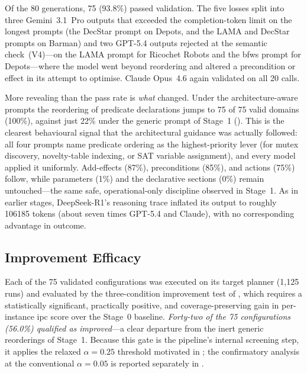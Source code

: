 Of the 80 generations, 75 (93.8\%) passed validation. The five losses split into three Gemini~3.1~Pro outputs that exceeded the completion-token limit on the longest prompts (the DecStar prompt on Depots, and the LAMA and DecStar prompts on Barman) and two GPT-5.4 outputs rejected at the semantic check~(V4)---on the LAMA prompt for Ricochet Robots and the \gls{bfws} prompt for Depots---where the model went beyond reordering and altered a precondition or effect in its attempt to optimise. Claude Opus~4.6 again validated on all 20 calls.

More revealing than the pass rate is \emph{what} changed. Under the architecture-aware prompts the reordering of predicate declarations jumps to 75 of 75 valid domains (100\%), against just 22\% under the generic prompt of Stage~1 (). This is the clearest behavioural signal that the architectural guidance was actually followed: all four prompts name predicate ordering as the highest-priority lever (for mutex discovery, novelty-table indexing, or SAT variable assignment), and every model applied it uniformly. Add-effects (87\%), preconditions (85\%), and actions (75\%) follow, while parameters (1\%) and the declarative sections (0\%) remain untouched---the same safe, operational-only discipline observed in Stage~1. As in earlier stages, DeepSeek-R1's reasoning trace inflated its output to roughly \num{106185} tokens (about seven times GPT-5.4 and Claude), with no corresponding advantage in outcome.

\subsection{Improvement Efficacy}
\label{sec:results:stage2:efficacy}

Each of the 75 validated configurations was executed on its target planner (1{,}125 runs) and evaluated by the three-condition improvement test of , which requires a statistically significant, practically positive, and coverage-preserving gain in per-instance \gls{ipc} score over the Stage~0 baseline.
\emph{Forty-two of the 75 configurations (56.0\%) qualified as improved}---a clear departure from the inert generic reorderings of Stage~1.
Because this gate is the pipeline's internal screening step, it applies the relaxed $\alpha = 0.25$ threshold motivated in ; the confirmatory analysis at the conventional $\alpha = 0.05$ is reported separately in .

